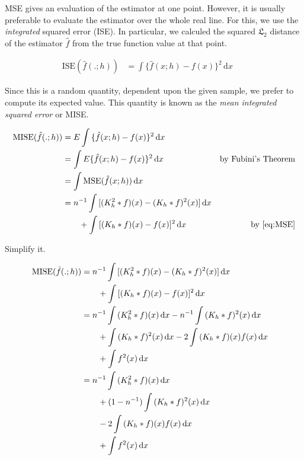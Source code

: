 MSE gives an evaluation of the estimator at one point.
However, it is usually preferable to evaluate the estimator over the whole real line.
For this, we use the \textit{integrated} squared error (ISE).
In particular, we calculed the squared $\mathfrak{L}_2$ distance of the estimator $\hat{f}$ from the true function value at that point.

\begin{align}
\mbox{ISE}(\hat{f}(.;h)) & = \int{\{ \hat{f}(x;h) - f(x) \} ^2 }\,\mathrm{d}x && \nonumber
\end{align}

Since this is a random quantity, dependent upon the given sample, we prefer to compute its expected value.
This quantity is known as the \textit{mean integrated squared error} or MISE.

\begin{align}
\mbox{MISE}(\hat{f}(.;h)) & = E \int{\{ \hat{f}(x;h) - f(x) \} ^2 }\,\mathrm{d}x && \nonumber \\
    & = \int{ E \{ \hat{f}(x;h) - f(x) \} ^2 }\,\mathrm{d}x & \text{by Fubini's Theorem} & \nonumber \\
    & = \int{ \mbox{MSE}(\hat{f}(x;h))\, \mathrm{d}x} & & \nonumber \\
    & = n^{-1} \int{ [ \conv{K_h^2}{f}(x) - \conv{K_h}{f}^2(x) ]\,\mathrm{d}x } \nonumber \\
    & \qquad + \int{ [ \conv{K_h}{f}(x) - f(x) ]^2\,\mathrm{d}x} & \text{by \autoref{eq:MSE}} \nonumber
\end{align}

Simplify it.

\begin{align}
\mbox{MISE}(\hat{f}(.;h)) & = n^{-1} \int{ [ (\ensuremath{K_h^2 \ast f})(x) - (\ensuremath{K_h \ast f})^2(x) ]\,\mathrm{d}x } && \nonumber \\
    & \qquad + \int{ [ (\ensuremath{K_h \ast f})(x) - f(x) ]^2\,\mathrm{d}x} && \nonumber \\
    & = n^{-1} \int{ (\ensuremath{K_h^2 \ast f})(x)\,\mathrm{d}x } - n^{-1} \int{(\ensuremath{K_h \ast f})^2(x)\,\mathrm{d}x } && \nonumber \\
    & \qquad + \int{ (\ensuremath{K_h \ast f})^2(x)\,\mathrm{d}x} - 2\int{(\ensuremath{K_h \ast f})(x) f(x)\,\mathrm{d}x } && \nonumber \\
    & \qquad + \int{ f^2(x)\,\mathrm{d}x} && \nonumber \\
    & = n^{-1} \int{ (\ensuremath{K_h^2 \ast f})(x)\,\mathrm{d}x } && \nonumber \\
    & \qquad + (1 - n^{-1}) \int{(\ensuremath{K_h \ast f})^2(x)\,\mathrm{d}x } && \nonumber \\
    & \qquad - 2\int{(\ensuremath{K_h \ast f})(x) f(x)\,\mathrm{d}x } && \nonumber \\
    & \qquad + \int{ f^2(x)\,\mathrm{d}x} \label{eq:MISE-1} &&
\end{align}

